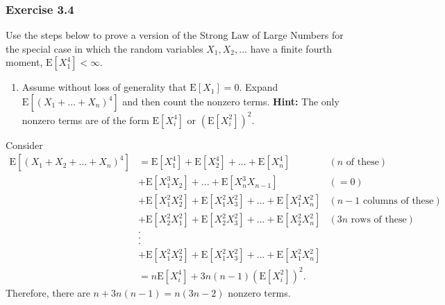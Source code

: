 \documentclass[12pt,]{article}
\providecommand{\tightlist}{%
  \setlength{\itemsep}{0pt}\setlength{\parskip}{0pt}}
\begin{document}
\hypertarget{exercise-3.4}{%
\subsubsection{Exercise 3.4}\label{exercise-3.4}}

Use the steps below to prove a version of the Strong Law of Large
Numbers for the special case in which the random variables
\(X_1, X_2, ...\) have a finite fourth moment,
\(\text{E}[X_1^4] < \infty.\)

\begin{enumerate}
\def\labelenumi{(\alph{enumi})}
\tightlist
\item
  Assume without loss of generality that \(\text{E}[X_1]=0.\) Expand
  \(\text{E}[(X_1+...+X_n)^4]\) and then count the nonzero terms.
  \textbf{Hint:} The only nonzero terms are of the form
  \(\text{E}[X_i^4]\) or \((\text{E}[X_i^2])^2.\)
\end{enumerate}

Consider \begin{align*}
\text{E}[(X_1+X_2+...+X_n)^4] &= \text{E}[X_1^4]+\text{E}[X_2^4]+...+\text{E}[X_n^4] & (n \text{ of these})\\
& + \text{E}[X_1^3X_2] + ... + \text{E}[X_n^3X_{n-1}] &(=0)\\
& + \text{E}[X_1^2X_2^2] + \text{E}[X_1^2X_3^2]+...+\text{E}[X_1^2X_n^2] & (n-1\text{ columns of these})\\
& + \text{E}[X_2^2X_1^2] + \text{E}[X_2^2X_3^2]+...+\text{E}[X_2^2X_n^2] & (3n \text{ rows of these})\\
& .\\
& .\\
& . \\
& + \text{E}[X_1^2X_2^2] + \text{E}[X_1^2X_3^2]+...+\text{E}[X_1^2X_n^2]\\
& = n\text{E}[X_i^4]+3n(n-1)\left(\text{E}[X_i^2]\right)^2.
\end{align*} Therefore, there are \(n+3n(n-1) = n(3n-2)\) nonzero terms.
\end{document}
